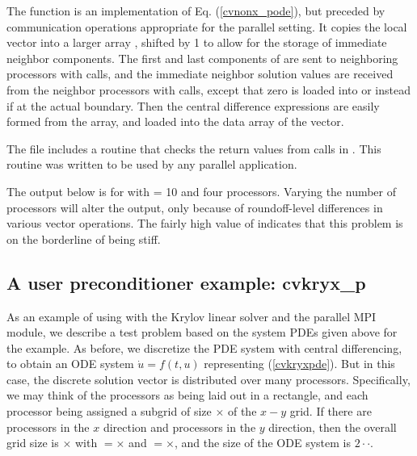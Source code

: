 The  function is an implementation of Eq. (\ref{cvnonx_pode}), but preceded
by communication operations appropriate for the parallel setting.
It copies the local vector  into a larger array , shifted by 1
to allow for the storage of immediate neighbor components.  The first and last
components of  are sent to neighboring processors with  calls,
and the immediate neighbor solution values are received from the neighbor
processors with  calls, except that zero is loaded into 
or  instead if at the actual boundary.  Then the central
difference expressions are easily formed from the  array, and loaded into
the data array of the  vector.

The  file includes a routine  that checks the
return values from calls in .  This routine was written to be used
by any parallel {\sundials} application.

The output below is for  with  = 10 and four processors. 
Varying the number of processors will alter the output, only because
of roundoff-level differences in various vector operations.  The fairly
high value of  indicates that this problem is on the borderline
of being stiff.



\subsection{A user preconditioner example: cvkryx\_p}\label{ss:cvkryx_p}

As an example of using {\cvode} with the Krylov linear solver
{\cvspgmr} and the parallel MPI {\nvecp} module, we describe a test
problem based on the system PDEs given above for the  example.  
As before, we discretize the PDE system with central differencing, to
obtain an ODE system $\dot{u} = f(t,u)$ representing (\ref{cvkryxpde}).  
But in this case, the discrete solution vector is distributed over
many processors.  Specifically, we may think of the processors as
being laid out in a rectangle, and each processor being assigned a
subgrid of size $\times$ of the $x-y$ grid. If
there are  processors in the $x$ direction and 
processors in the $y$ direction, then the overall grid size is
$\times$ with $=$$\times$ and
$=$$\times$, and the size of the ODE system is
$2\cdot$$\cdot$.  

